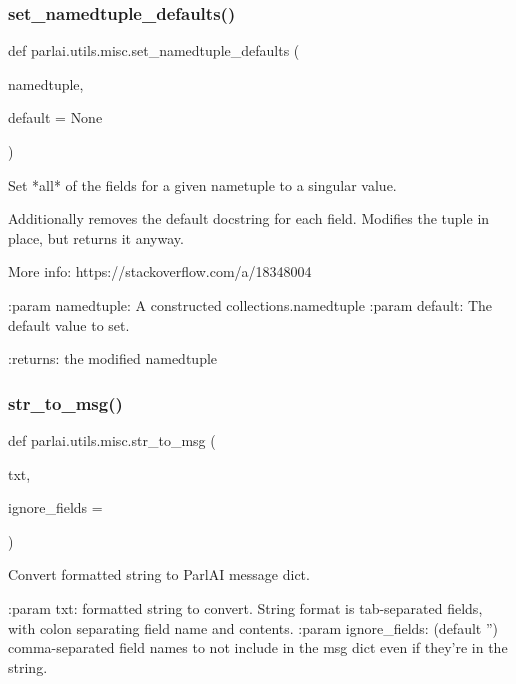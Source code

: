 \subsubsection{\texorpdfstring{set\+\_\+namedtuple\+\_\+defaults()}{set\_namedtuple\_defaults()}}
{\footnotesize\ttfamily def parlai.\+utils.\+misc.\+set\+\_\+namedtuple\+\_\+defaults (\begin{DoxyParamCaption}\item[{}]{namedtuple,  }\item[{}]{default = {\ttfamily None} }\end{DoxyParamCaption})}

\begin{DoxyVerb}Set *all* of the fields for a given nametuple to a singular value.

Additionally removes the default docstring for each field.
Modifies the tuple in place, but returns it anyway.

More info:
https://stackoverflow.com/a/18348004

:param namedtuple: A constructed collections.namedtuple
:param default: The default value to set.

:returns: the modified namedtuple
\end{DoxyVerb}
 \mbox{\label{namespaceparlai_1_1utils_1_1misc_a1b053cd9c56e6fa79b058fff587b3a48}} 
\subsubsection{\texorpdfstring{str\+\_\+to\+\_\+msg()}{str\_to\_msg()}}
{\footnotesize\ttfamily def parlai.\+utils.\+misc.\+str\+\_\+to\+\_\+msg (\begin{DoxyParamCaption}\item[{}]{txt,  }\item[{}]{ignore\+\_\+fields = {\ttfamily \textquotesingle{}\textquotesingle{}} }\end{DoxyParamCaption})}

\begin{DoxyVerb}Convert formatted string to ParlAI message dict.

:param txt:
    formatted string to convert. String format is tab-separated fields,
    with colon separating field name and contents.
:param ignore_fields:
    (default '') comma-separated field names to not
    include in the msg dict even if they're in the string.
\end{DoxyVerb}
 \mbox{\label{namespaceparlai_1_1utils_1_1misc_acf146e70ea7f6867969a7c2b545d4b4b}} 
